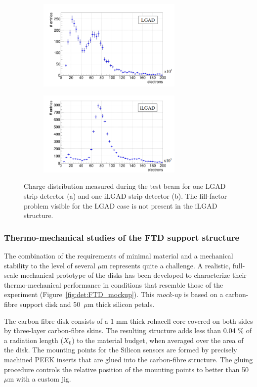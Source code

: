 \begin{figure}[t]
\centering
\begin{subfigure}{0.48\textwidth}
\includegraphics[width=7cm]{Detector/fig/fill-factor_a.png}
\caption{}
\end{subfigure}
\begin{subfigure}{0.48\textwidth}
\includegraphics[width=7cm]{Detector/fig/fill-factor_b.png}
\caption{}
\end{subfigure}
\caption{Charge distribution measured during the test beam for one LGAD strip detector (a) and one iLGAD strip detector (b). The fill-factor problem visible for the LGAD case is not present in the iLGAD structure.} 
\label{fig:det:fill-factor}
\centering
\end{figure}


\subsubsection{Thermo-mechanical studies of the FTD support structure}

The combination of the requirements of minimal material and a mechanical stability to 
the level of several $\mu\mathrm{m}$ represents quite a challenge. A realistic, 
full-scale mechanical prototype of the disks has been developed to characterize 
their thermo-mechanical performance 
in conditions that resemble those of the experiment (Figure~\ref{fig:det:FTD_mockup}). 
This {\em mock-up} is based on a carbon-fibre support disk
and 50~$\mu\mathrm{m}$ thick silicon petals. 

The carbon-fibre disk consists of
a 1 mm thick rohacell core covered on both sides by three-layer carbon-fibre skins. The resulting structure adds less than 0.04 \% of a radiation length ($X_0$) to the material budget, when averaged over the area of the disk. The mounting points for the Silicon sensors are formed by precisely machined 
PEEK inserts that are glued into the carbon-fibre structure. The gluing procedure controls the relative position of the mounting points to better than 50 $\mu \mathrm{m}$ with a custom jig. 

